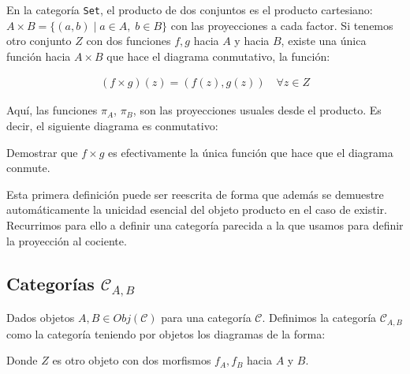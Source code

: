 \documentclass[11pt, fleqn, spanish]{book}
\newcommand{\C}{\mathcal{C}}
\begin{document}
\begin{example} 
  En la categoría \texttt{Set}, el producto de dos conjuntos es el
  producto cartesiano:
  $A \times B = \{(a,b) \; | \; a \in A, \; b \in B \}$ con las
  proyecciones a cada factor. Si tenemos
  otro conjunto $Z$ con dos funciones $f,g$ hacia $A$ y hacia $B$,
  existe una única función hacia $A \times B$ que hace el diagrama
  conmutativo, la función:
  
  \begin{gather*}
    (f \times g)(z) = (f(z),g(z)) \quad \forall z \in Z
  \end{gather*}
  
  Aquí, las funciones $\pi_A$, $\pi_B$, son las proyecciones usuales
  desde el producto. Es decir, el siguiente diagrama es conmutativo:
  
  \begin{center}
  \end{center}
\end{example}

\begin{exercise} 
  Demostrar que $f \times g$ es efectivamente la única función que
  hace que el diagrama conmute.
\end{exercise}

    
Esta primera definición puede ser reescrita de forma que además se
demuestre automáticamente la unicidad esencial del objeto producto en
el caso de existir. Recurrimos para ello a definir una categoría
parecida a la que usamos para definir la proyección al cociente.


\subsection{Categorías \texorpdfstring{$\C_{A,B}$}{C A,B}}
Dados objetos $A,B \in Obj(\C)$ para una categoría $\C$. Definimos la categoría $\C_{A,B}$
como la categoría teniendo por objetos los diagramas de la forma:

\begin{center}
\end{center}

Donde $Z$ es otro objeto con dos morfismos $f_A,f_B$ hacia $A$ y $B$.
\end{document}
